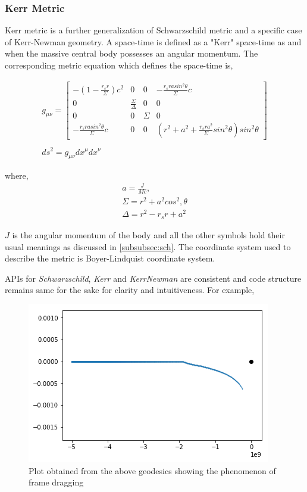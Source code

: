 \documentclass[onecolumn]{aa}
\begin{document}
\subsubsection{Kerr Metric}
Kerr metric \citep{Kerr:1963ud} is a further generalization of Schwarzschild metric and a specific case of Kerr-Newman geometry. A space-time is defined as a "Kerr" space-time as and when the massive central body possesses an angular momentum. The corresponding metric equation which defines the space-time is,

\begin{gather}
g_{\mu \nu} = \begin{bmatrix} - (1 - \frac{r_s r}{\Sigma})c^2 & 0 & 0 & -\frac{r_s r a sin^2 \theta}{\Sigma}c \\ 0 & \frac{\Sigma}{\Delta} & 0 & 0 \\ 0 & 0 & \Sigma & 0 \\ -\frac{r_s r a sin^2 \theta}{\Sigma}c & 0 & 0 &  (r^2 + a^2 + \frac{r_s r a^2}{\Sigma}sin^2 \theta) sin^2 \theta \end{bmatrix} \\ 
\nonumber \\
ds^2 = g_{\mu \nu} dx^\mu dx^\nu
\end{gather}

where,
\begin{gather}
a = \frac{J}{Mc}, \nonumber \\
\Sigma = r^2 + a^2 cos^2, \nonumber \theta \\
\Delta  = r^2 - r_s r + a^2 \nonumber
\end{gather}

$J$ is the angular momentum of the body and all the other symbols hold their usual meanings as discussed in \ref{subsubsec:sch}. The coordinate system used to describe the metric is Boyer-Lindquist coordinate system.

APIs for \textit{Schwarzschild}, \textit{Kerr} and \textit{KerrNewman} are consistent and code structure remains same for the sake for clarity and intuitiveness. For example,



\begin{figure}[ht]
	\centering
	\includegraphics[scale=0.5]{figures/drag.png} %
	\caption{Plot obtained from the above geodesics showing the phenomenon of frame dragging}
	\label{fig:kerr}
\end{figure}
\end{document}
